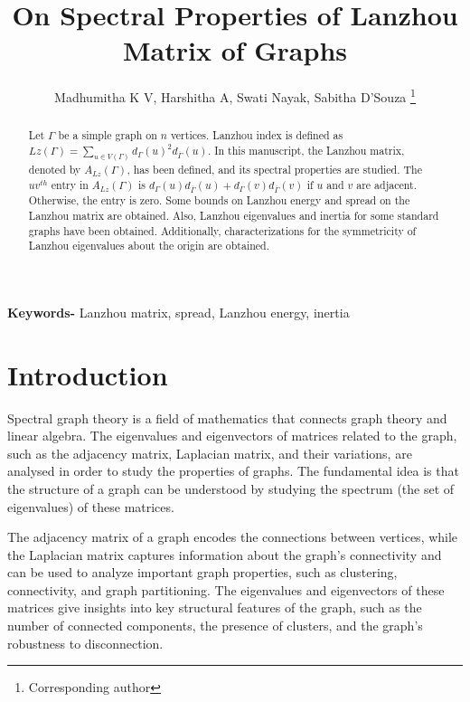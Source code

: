 \documentclass[10pt,a4paper,oneside]{article}
\begin{document}
\title{On Spectral Properties of Lanzhou Matrix of Graphs}
\author{Madhumitha K V, Harshitha A, Swati Nayak, Sabitha D'Souza \footnote{Corresponding author}}
\date{}

\maketitle

\begin{abstract}
Let $\Gamma$ be a simple graph on $n$ vertices. Lanzhou index is defined as $Lz(\Gamma)=\sum\limits_{u \in V(\Gamma)}d_\Gamma(u)^2d_{\overline{\Gamma}}(u).$ In this manuscript, the Lanzhou matrix, denoted by $A_{Lz}(\Gamma)$, has been defined, and its spectral properties are studied. The $uv^{th}$ entry in $A_{Lz}(\Gamma)$ is $d_\Gamma(u)d_{\overline{\Gamma}}(u)+d_\Gamma(v)d_{\overline{\Gamma}}(v)$ if $u$ and $v$ are adjacent. Otherwise, the entry is zero. Some bounds on Lanzhou energy and spread on the Lanzhou matrix are obtained. Also, Lanzhou eigenvalues and inertia for some standard graphs have been obtained. Additionally, characterizations for the symmetricity of Lanzhou eigenvalues about the origin are obtained.
\end{abstract}

\textbf{Keywords-} Lanzhou matrix, spread, Lanzhou energy, inertia


\section{Introduction}\label{1.1}
Spectral graph theory is a field of mathematics that connects graph theory and linear algebra. The eigenvalues and eigenvectors of matrices related to the graph, such as the adjacency matrix, Laplacian matrix, and their variations, are analysed in order to study the properties of graphs. The fundamental idea is that the structure of a graph can be understood by studying the spectrum (the set of eigenvalues) of these matrices.
	
The adjacency matrix of a graph encodes the connections between vertices, while the Laplacian matrix captures information about the graph’s connectivity and can be used to analyze important graph properties, such as clustering, connectivity, and graph partitioning. The eigenvalues and eigenvectors of these matrices give insights into key structural features of the graph, such as the number of connected components, the presence of clusters, and the graph’s robustness to disconnection.
	
\end{document}
